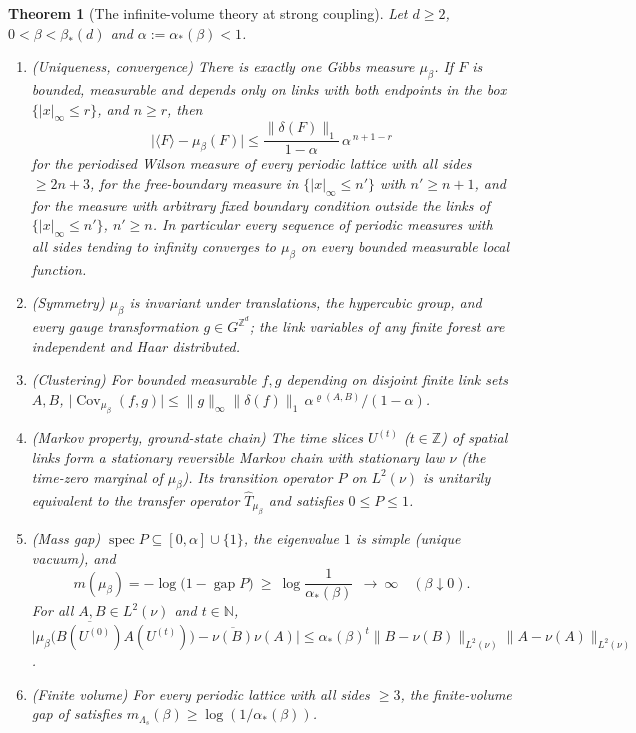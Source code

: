 \documentclass[11pt,a4paper]{article}
\newtheorem{theorem}{Theorem}[section]
\theoremstyle{definition}
\theoremstyle{remark}
\DeclareMathOperator{\spec}{spec}
\DeclareMathOperator{\Cov}{Cov}
\DeclareMathOperator{\gap}{gap}
\newcommand{\Z}{\mathbb{Z}}
\newcommand{\N}{\mathbb{N}}
\newcommand{\hT}{\hat{T}}
\newcommand{\norm}[1]{\lVert #1\rVert}
\newcommand{\abs}[1]{\lvert #1\rvert}
\newcommand{\aS}{\alpha_*}
\newcommand{\bS}{\beta_*}
\begin{document}
\begin{theorem}[The infinite-volume theory at strong coupling]\label{iv:thm:main}
Let $d\ge2$, $0<\beta<\bS(d)$ and $\alpha:=\aS(\beta)<1$.
\begin{enumerate}[label=(\roman*)]
\item \emph{(Uniqueness, convergence)} There is exactly one Gibbs measure $\mu_\beta$. If $F$ is bounded, measurable and
depends only on links with both endpoints in the box $\{|x|_\infty\le r\}$, and $n\ge r$, then
\[
\bigl|\langle F\rangle-\mu_\beta(F)\bigr|\le\frac{\norm{\delta(F)}_1}{1-\alpha}\,\alpha^{\,n+1-r}
\]
for the periodised Wilson measure of every periodic lattice with all sides $\ge2n+3$, for the free-boundary measure in
$\{|x|_\infty\le n'\}$ with $n'\ge n+1$, and for the measure with arbitrary fixed boundary condition outside the links of
$\{|x|_\infty\le n'\}$, $n'\ge n$. In particular every sequence of periodic measures with all sides tending to infinity
converges to $\mu_\beta$ on every bounded measurable local function.
\item \emph{(Symmetry)} $\mu_\beta$ is invariant under translations, the hypercubic group, and every gauge
transformation $g\in G^{\Z^d}$; the link variables of any finite forest are independent and Haar distributed.
\item \emph{(Clustering)} For bounded measurable $f,g$ depending on disjoint finite link sets $A,B$,
$\abs{\Cov_{\mu_\beta}(f,g)}\le\norm g_\infty\norm{\delta(f)}_1\,\alpha^{\varrho(A,B)}/(1-\alpha)$.
\item \emph{(Markov property, ground-state chain)} The time slices $U^{(t)}$ ($t\in\Z$) of spatial links form a stationary
reversible Markov chain with stationary law $\nu$ (the time-zero marginal of $\mu_\beta$). Its transition operator $P$ on
$L^2(\nu)$ is unitarily equivalent to the transfer operator $\hT_{\mu_\beta}$ and satisfies $0\le P\le1$.
\item \emph{(Mass gap)} $\spec P\subseteq[0,\alpha]\cup\{1\}$, the eigenvalue $1$ is simple (unique vacuum), and
\[
m(\mu_\beta)=-\log\bigl(1-\gap P\bigr)\ \ge\ \log\frac1{\aS(\beta)}\ \ \longrightarrow\ \infty\quad(\beta\downarrow0).
\]
For all $A,B\in L^2(\nu)$ and $t\in\N$,
$\bigl|\mu_\beta\bigl(\overline{B(U^{(0)})}A(U^{(t)})\bigr)-\overline{\nu(B)}\nu(A)\bigr|\le\aS(\beta)^t
\norm{B-\nu(B)}_{L^2(\nu)}\norm{A-\nu(A)}_{L^2(\nu)}$.
\item \emph{(Finite volume)} For every periodic lattice with all sides $\ge3$, the finite-volume gap of \cite{F} satisfies
$m_{\Lambda_s}(\beta)\ge\log(1/\aS(\beta))$.
\end{enumerate}
\end{theorem}
\end{document}
